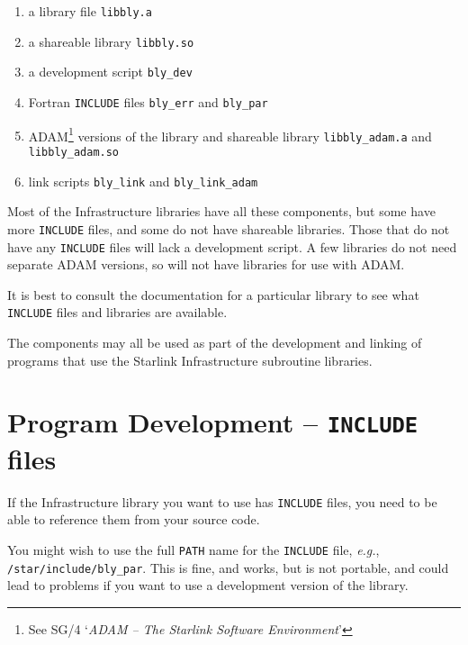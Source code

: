 \documentclass[twoside,11pt]{article}
\newcommand{\xlabel}[1]{}
\begin{document}
\begin{enumerate}

\item a library file \texttt{libbly.a}

\item a shareable library \texttt{libbly.so}

\item a development script \texttt{bly\_dev}

\item Fortran \texttt{INCLUDE} files \texttt{bly\_err} and \texttt{bly\_par}

\item ADAM\footnote{See SG/4 `\emph{ADAM -- The Starlink Software
Environment}'} versions of the library and shareable library
\texttt{libbly\_adam.a} and \texttt{libbly\_adam.so}

\item link scripts \texttt{bly\_link} and \texttt{bly\_link\_adam}

\end{enumerate}

Most of the Infrastructure libraries have all these components, but some
have more \texttt{INCLUDE} files, and some do not have shareable libraries.
Those that do not have any \texttt{INCLUDE} files will lack a development
script.  A few libraries do not need separate ADAM versions, so will not
have libraries for use with ADAM.

It is best to consult the documentation for a particular library to see
what \texttt{INCLUDE} files and libraries are available.

The components may all be used as part of the development and linking of
programs that use the Starlink Infrastructure subroutine libraries.

\section{\xlabel{program_development}Program Development -- \texttt{INCLUDE} files}
\label{program_development}

If the Infrastructure library you want to use has \texttt{INCLUDE} files, you
need to be able to reference them from your source code.

You might wish to use the full \texttt{PATH} name for the \texttt{INCLUDE}
file, \emph{e.g.}, \texttt{/star/include/bly\_par}.  This is fine, and works,
but is not portable, and could lead to problems if you want to use a
development version of the library.
\end{document}
